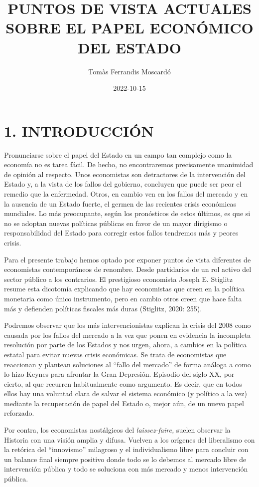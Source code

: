 \documentclass[
]{article}
\title{PUNTOS DE VISTA ACTUALES SOBRE EL PAPEL ECONÓMICO DEL ESTADO}
\author{Tomàs Ferrandis Moscardó}
\date{2022-10-15}
\begin{document}
\maketitle

{
\setcounter{tocdepth}{2}
\tableofcontents
}
\hypertarget{introducciuxf3n}{%
\section{1. INTRODUCCIÓN}\label{introducciuxf3n}}

Pronunciarse sobre el papel del Estado en un campo tan complejo como la
economía no es tarea fácil. De hecho, no encontraremos precisamente
unanimidad de opinión al respecto. Unos economistas son detractores de
la intervención del Estado y, a la vista de los fallos del gobierno,
concluyen que puede ser peor el remedio que la enfermedad. Otros, en
cambio ven en los fallos del mercado y en la ausencia de un Estado
fuerte, el germen de las recientes crisis económicas mundiales. Lo más
preocupante, según los pronósticos de estos últimos, es que si no se
adoptan nuevas políticas públicas en favor de un mayor dirigismo o
responsabilidad del Estado para corregir estos fallos tendremos más y
peores crisis.

Para el presente trabajo hemos optado por exponer puntos de vista
diferentes de economistas contemporáneos de renombre. Desde partidarios
de un rol activo del sector público a los contrarios. El prestigioso
economista Joseph E. Stiglitz resume esta dicotomía explicando que hay
economistas que creen en la política monetaria como único instrumento,
pero en cambio otros creen que hace falta más y defienden políticas
fiscales más duras (Stiglitz, 2020: 255).

Podremos observar que los más intervencionistas explican la crisis del
2008 como causada por los fallos del mercado a la vez que ponen en
evidencia la incompleta resolución por parte de los Estados y nos urgen,
ahora, a cambios en la política estatal para evitar nuevas crisis
económicas. Se trata de economistas que reaccionan y plantean soluciones
al ``fallo del mercado'' de forma análoga a como lo hizo Keynes para
afrontar la Gran Depresión. Episodio del siglo XX, por cierto, al que
recurren habitualmente como argumento. Es decir, que en todos ellos hay
una voluntad clara de salvar el sistema económico (y político a la vez)
mediante la recuperación de papel del Estado o, mejor aún, de un nuevo
papel reforzado.

Por contra, los economistas nostálgicos del \emph{laissez-faire,} suelen
observar la Historia con una visión amplia y difusa. Vuelven a los
orígenes del liberalismo con la retórica del ``innovismo'' milagroso y
el individualismo libre para concluir con un balance final siempre
positivo donde todo se lo debemos al mercado libre de intervención
pública y todo se soluciona con más mercado y menos intervención
pública.
\end{document}
